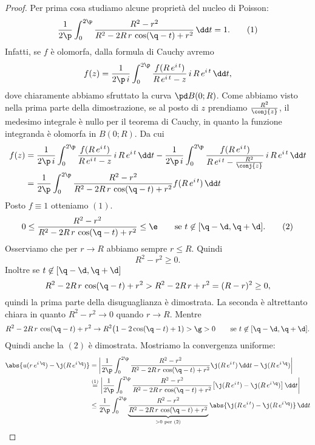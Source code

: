 \begin{proof}
	Per prima cosa studiamo alcune proprietà del nucleo di Poisson:
	\begin{equation*}
		\frac{1}{2\p}\int_0^{2\p} \frac{R^2-r^2}{R^2-2R\,r\,\cos(\q-t)+r^2}\,\dd t =1.\tag{1}
	\end{equation*}
	Infatti, se \(f\) è olomorfa, dalla formula di Cauchy avremo
	\[
		f(z) = \frac{1}{2\p\,i} \int_0^{2\p} \frac{f(R\,e^{i\,t})}{R\,e^{i\,t}-z}\,i\,R\,e^{i\,t}\,\dd t,
	\]
	dove chiaramente abbiamo sfruttato la curva \(\pd B(0;R)\). Come abbiamo visto nella prima parte della dimostrazione, se al posto di \(z\) prendiamo \(\frac{R^2}{\conj{z}}\), il medesimo integrale è nullo per il teorema di Cauchy, in quanto la funzione integranda è olomorfa in \(B(0;R)\). Da cui
	\[
		\begin{split}
			f(z) & = \frac{1}{2\p\,i} \int_0^{2\p} \frac{f(R\,e^{i\,t})}{R\,e^{i\,t}-z}\,i\,R\,e^{i\,t}\,\dd t - \frac{1}{2\p\,i} \int_0^{2\p} \frac{f(R\,e^{i\,t})}{R\,e^{i\,t}-\frac{R^2}{\conj{z}}}\,i\,R\,e^{i\,t}\,\dd t\\
			& = \frac{1}{2\p} \int_0^{2\p} \frac{R^2-r^2}{R^2-2R\,r\,\cos(\q-t)+r^2} f(R\,e^{i\,t})\,\dd t
		\end{split}
	\]
	Posto \(f\equiv 1\) otteniamo \((1)\).
	\begin{equation*}
		0 \le \frac{R^2-r^2}{R^2-2R\,r\,\cos(\q-t)+r^2} \le \e \qquad\text{se }t\not\in [\q-\d,\q+\d].\tag{2}
	\end{equation*}
	Osserviamo che per \(r \to R\) abbiamo sempre \(r\le R\). Quindi
	\[
		R^2 -r^2 \ge 0.
	\]
	Inoltre se \(t\not\in[\q-\d,\q+\d]\)
	\[
		R^2-2R\,r\,\cos(\q-t)+r^2 > R^2-2R\,r+r^2 = (R-r)^2 \ge 0,
	\]
	quindi la prima parte della disuguaglianza è dimostrata. La seconda è altrettanto chiara in quanto \(R^2-r^2 \to 0\) quando \(r\to R\). Mentre
	\[
		R^2-2R\,r\,\cos(\q-t)+r^2 \to R^2\big(1-2\cos(\q-t)+1) > \g > 0 \qquad\text{se }t\not\in[\q-\d,\q+\d].
	\]
	Quindi anche la \((2)\) è dimostrata. Mostriamo la convergenza uniforme:
	\[
		\begin{split}
			\abs{u(r\,e^{i\,\q})-\j(R\,e^{i\,\q})} & = \bigg\lvert \frac{1}{2\p} \int_0^{2\p} \frac{R^2-r^2}{R^2-2R\,r\,\cos(\q-t)+r^2}\j(R\,e^{i\,t})\,\dd t - \j(R\,e^{i\,\q}) \bigg\rvert\\
			& \overset{(1)}{=} \bigg\lvert \frac{1}{2\p} \int_0^{2\p}\frac{R^2-r^2}{R^2-2R\,r\,\cos(\q-t)+r^2}\big[\j(R\,e^{i\,t})-\j(R\,e^{i\,\q})\big]\,\dd t \bigg\rvert\\
			& \le \frac{1}{2\p} \int_0^{2\p} \underbrace{\frac{R^2-r^2}{R^2-2R\,r\,\cos(\q-t)+r^2}}_{>0 \text{ per }(2)} \abs{\j(R\,e^{i\,t})-\j(R\,e^{i\,\q})}\,\dd t

\end{split}\]
\end{proof}
